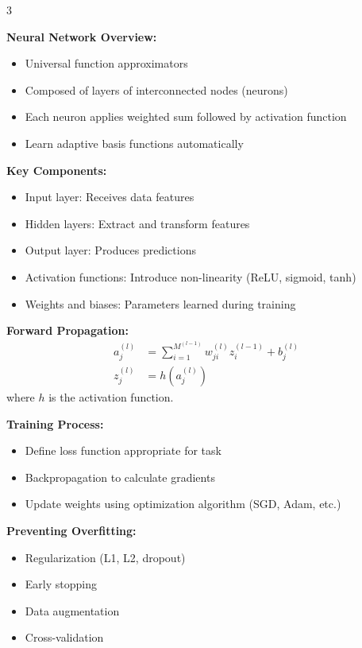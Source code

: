 \documentclass[10pt,landscape]{article}
\begin{document}
\begin{multicols}{3}
\begin{tcolorbox}[breakable, title=3. Neural Networks Concepts, colback=neural]
\textbf{Neural Network Overview:}
\begin{itemize}[leftmargin=*,noitemsep,topsep=0pt]
    \item Universal function approximators
    \item Composed of layers of interconnected nodes (neurons)
    \item Each neuron applies weighted sum followed by activation function
    \item Learn adaptive basis functions automatically
\end{itemize}

\textbf{Key Components:}
\begin{itemize}[leftmargin=*,noitemsep,topsep=0pt]
    \item Input layer: Receives data features
    \item Hidden layers: Extract and transform features
    \item Output layer: Produces predictions
    \item Activation functions: Introduce non-linearity (ReLU, sigmoid, tanh)
    \item Weights and biases: Parameters learned during training
\end{itemize}

\textbf{Forward Propagation:}
\begin{align}
a^{(l)}_j &= \sum_{i=1}^{M^{(l-1)}} w^{(l)}_{ji} z^{(l-1)}_i + b^{(l)}_j\\
z^{(l)}_j &= h(a^{(l)}_j)
\end{align}
where $h$ is the activation function.

\textbf{Training Process:}
\begin{itemize}[leftmargin=*,noitemsep,topsep=0pt]
    \item Define loss function appropriate for task
    \item Backpropagation to calculate gradients
    \item Update weights using optimization algorithm (SGD, Adam, etc.)
\end{itemize}

\textbf{Preventing Overfitting:}
\begin{itemize}[leftmargin=*,noitemsep,topsep=0pt]
    \item Regularization (L1, L2, dropout)
    \item Early stopping
    \item Data augmentation
    \item Cross-validation
\end{itemize}
\end{tcolorbox}


\end{multicols}
\end{document}
